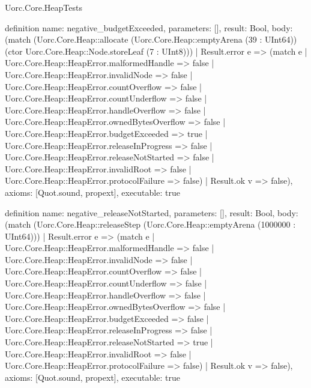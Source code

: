 \begin{lexlean}{Uorc.Core.HeapTests}
\begin{semanticmodule}
definition{
  name: negative_budgetExceeded,
  parameters: [],
  result: Bool,
  body: (match (Uorc.Core.Heap::allocate (Uorc.Core.Heap::emptyArena (39 : UInt64)) (ctor Uorc.Core.Heap::Node.storeLeaf (7 : UInt8)))
    | Result.error e => (match e
      | Uorc.Core.Heap::HeapError.malformedHandle => false
      | Uorc.Core.Heap::HeapError.invalidNode => false
      | Uorc.Core.Heap::HeapError.countOverflow => false
      | Uorc.Core.Heap::HeapError.countUnderflow => false
      | Uorc.Core.Heap::HeapError.handleOverflow => false
      | Uorc.Core.Heap::HeapError.ownedBytesOverflow => false
      | Uorc.Core.Heap::HeapError.budgetExceeded => true
      | Uorc.Core.Heap::HeapError.releaseInProgress => false
      | Uorc.Core.Heap::HeapError.releaseNotStarted => false
      | Uorc.Core.Heap::HeapError.invalidRoot => false
      | Uorc.Core.Heap::HeapError.protocolFailure => false)
    | Result.ok v => false),
  axioms: [Quot.sound, propext],
  executable: true
}

definition{
  name: negative_releaseNotStarted,
  parameters: [],
  result: Bool,
  body: (match (Uorc.Core.Heap::releaseStep (Uorc.Core.Heap::emptyArena (1000000 : UInt64)))
    | Result.error e => (match e
      | Uorc.Core.Heap::HeapError.malformedHandle => false
      | Uorc.Core.Heap::HeapError.invalidNode => false
      | Uorc.Core.Heap::HeapError.countOverflow => false
      | Uorc.Core.Heap::HeapError.countUnderflow => false
      | Uorc.Core.Heap::HeapError.handleOverflow => false
      | Uorc.Core.Heap::HeapError.ownedBytesOverflow => false
      | Uorc.Core.Heap::HeapError.budgetExceeded => false
      | Uorc.Core.Heap::HeapError.releaseInProgress => false
      | Uorc.Core.Heap::HeapError.releaseNotStarted => true
      | Uorc.Core.Heap::HeapError.invalidRoot => false
      | Uorc.Core.Heap::HeapError.protocolFailure => false)
    | Result.ok v => false),
  axioms: [Quot.sound, propext],
  executable: true
}


\end{semanticmodule}
\end{lexlean}
